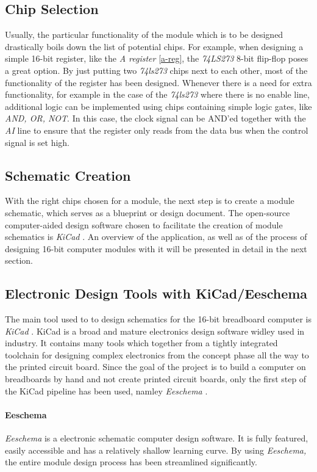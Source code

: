 \subsection{Chip Selection}
Usually, the particular functionality of the module which is to be designed drastically boils down the list of potential chips.
For example, when designing a simple 16-bit register, like the \emph{A register} \ref{a-reg}, the \emph{74LS273} 8-bit flip-flop
\cite{74ls273} poses a great option. By just putting two \emph{74ls273} chips next to each other, most of the functionality of the
register has been designed. Whenever there is a need for extra functionality, for example in the case of the \emph{74ls273}
where there is no enable line, additional logic can be implemented using chips containing simple logic gates, like \emph{AND, OR,
NOT}. In this case, the clock signal can be AND'ed together with the \emph{AI} line to ensure that the register only reads from the
data bus when the control signal is set high.

\subsection{Schematic Creation}
With the right chips chosen for a module, the next step is to create a module schematic, which serves as a blueprint or design
document. The open-source computer-aided design software chosen to facilitate the creation of module schematics is \emph{KiCad}
\cite{kicad}. An overview of the application, as well as of the process of designing 16-bit computer modules with it will be
presented in detail in the next section.

\subsection{Electronic Design Tools with KiCad/Eeschema}
The main tool used to to design schematics for the 16-bit breadboard computer is \emph{KiCad} \cite{kicad}. KiCad is a broad and
mature electronics design software widley used in industry. It contains many tools which together from a tightly integrated
toolchain for designing complex electronics from the concept phase all the way to the printed circuit board. Since the goal of the
project is to build a computer on breadboards by hand and not create printed circuit boards, only the first step of the KiCad
pipeline has been used, namley \emph{Eeschema} \cite{eeschema}.

\paragraph{Eeschema}
\emph{Eeschema} is a electronic schematic computer design software. It is fully featured, easily accessible and has a relatively
shallow learning curve. By using \emph{Eeschema,} the entire module design process has been streamlined significantly.

